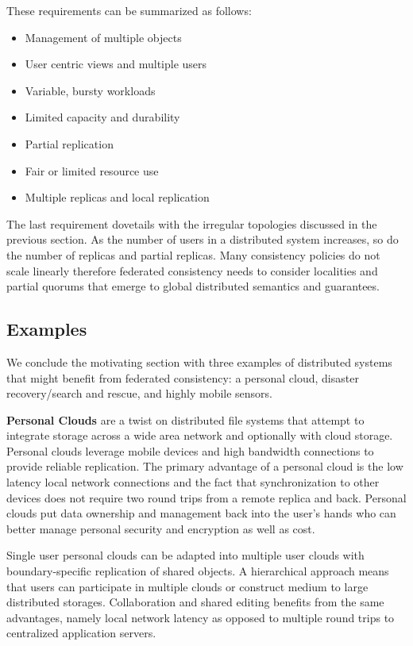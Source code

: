 \documentclass[letterpaper,twocolumn,10pt]{article}
\begin{document}
These requirements can be summarized as follows:

\begin{itemize}
    \item Management of multiple objects
    \item User centric views and multiple users
    \item Variable, bursty workloads
    \item Limited capacity and durability
    \item Partial replication
    \item Fair or limited resource use
    \item Multiple replicas and local replication
\end{itemize}

The last requirement dovetails with the irregular topologies discussed in the previous section. As the number of users in a distributed system increases, so do the number of replicas and partial replicas. Many consistency policies do not scale linearly therefore federated consistency needs to consider localities and partial quorums that emerge to global distributed semantics and guarantees.

\subsection{Examples}

We conclude the motivating section with three examples of distributed systems that might benefit from federated consistency: a personal cloud, disaster recovery/search and rescue, and highly mobile sensors.

\textbf{Personal Clouds} are a twist on distributed file systems that attempt to integrate storage across a wide area network and optionally with cloud storage. Personal clouds leverage mobile devices and high bandwidth connections to provide reliable replication. The primary advantage of a personal cloud is the low latency local network connections and the fact that synchronization to other devices does not require two round trips from a remote replica and back. Personal clouds put data ownership and management back into the user's hands who can better manage personal security and encryption as well as cost.

Single user personal clouds can be adapted into multiple user clouds with boundary-specific replication of shared objects. A hierarchical approach means that users can participate in multiple clouds or construct medium to large distributed storages. Collaboration and shared editing benefits from the same advantages, namely local network latency as opposed to multiple round trips to centralized application servers.
\end{document}
